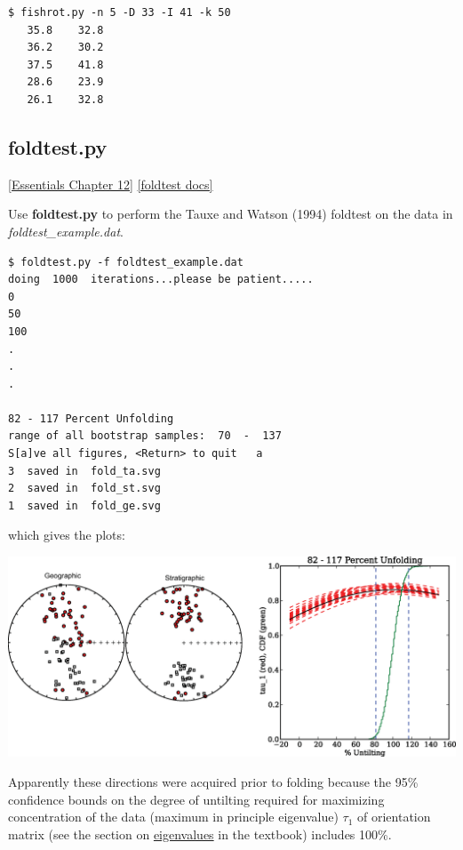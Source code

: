 \documentclass[11pt]{book}
\begin{document}
{{\begin{verbatim}
$ fishrot.py -n 5 -D 33 -I 41 -k 50
   35.8    32.8
   36.2    30.2
   37.5    41.8
   28.6    23.9
   26.1    32.8
   \end{verbatim}

 \subsection{foldtest.py}
 \href{http://earthref.org/MAGIC/books/Tauxe/Essentials/WebBook3ch12.html#ch12}{[Essentials Chapter 12]}
 \href{https://github.com/PmagPy/PmagPy/blob/master/programs/foldtest.py}{[foldtest docs]}

 Use {\bf foldtest.py} to perform the Tauxe and Watson (1994) \nocite{tauxe94}  foldtest on the data in {\it foldtest\_example.dat}.

 \begin{verbatim}
$ foldtest.py -f foldtest_example.dat
doing  1000  iterations...please be patient.....
0
50
100
.
.
.

82 - 117 Percent Unfolding
range of all bootstrap samples:  70  -  137
S[a]ve all figures, <Return> to quit   a
3  saved in  fold_ta.svg
2  saved in  fold_st.svg
1  saved in  fold_ge.svg
 \end{verbatim}

\noindent  which gives the plots:

 {%
   \includegraphics[width=15cm]{EPSfiles/foldtest-ex.eps}}

 Apparently these directions were acquired prior to folding because the 95\% confidence bounds on the degree of untilting required for maximizing concentration of the data (maximum in principle eigenvalue) $\tau_1$ of orientation matrix (see the section on  \href{http://earthref.org/MAGIC/books/Tauxe/Essentials/WebBook3ap1.html#orientation_tensor}{eigenvalues} in the textbook) includes 100\%.
%
%

}}
\end{document}
